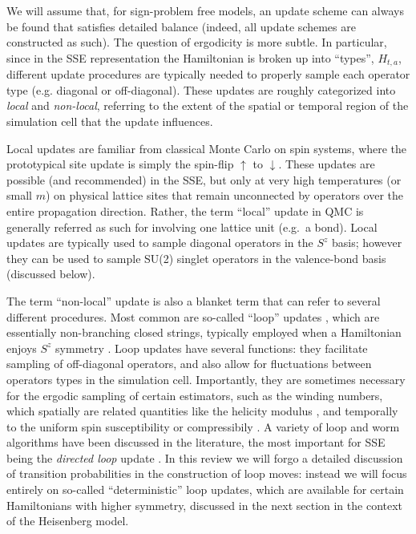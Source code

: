 \documentclass[vecphys]{svmult}
\begin{document}
We will assume that, for sign-problem free models, an update scheme can always be found that satisfies detailed balance (indeed, all update schemes are constructed as such).  The question of ergodicity is more subtle.  
In particular, since in the SSE representation the Hamiltonian is broken up into ``types'', $H_{t,a}$, different update procedures are typically needed to properly sample each operator type (e.g. diagonal or off-diagonal).  These updates are roughly categorized into {\em local} and {\em non-local}, referring to the extent of the spatial or temporal region of the simulation cell that the update influences.

Local updates are familiar from classical Monte Carlo on spin systems, where the prototypical site update is simply the spin-flip $\uparrow$ to $\downarrow$.  These updates are possible (and recommended) in the SSE, but only at very high temperatures (or small $m$) on physical lattice sites that remain unconnected by operators over the entire propagation direction.  Rather, the term ``local'' update in QMC is generally referred as such for involving one lattice unit (e.g.~a bond).  Local updates are typically used to sample diagonal operators in the $S^z$ basis; however they can be used to sample SU(2) singlet operators in the valence-bond basis (discussed below).

The term ``non-local'' update is also a blanket term that can refer to several different procedures.  Most common are so-called ``loop'' updates \cite{Melko:Evertz93},
which are essentially non-branching closed strings,
typically employed when a Hamiltonian enjoys $S^z$ symmetry \cite{Melko:Sandvik99}.  Loop updates have several functions: they facilitate sampling of off-diagonal operators, and also allow for fluctuations between operators types in the simulation cell.  Importantly, they are sometimes necessary for the ergodic sampling of certain estimators, such as the winding numbers, which spatially are related quantities like the helicity modulus \cite{Melko:PC}, and temporally to the uniform spin susceptibility or compressibily \cite{Melko:HGEloop}.  A variety of loop and worm algorithms have been discussed in the literature, the most important for SSE being the {\em directed loop} update \cite{Melko:Syljuasen02}.  In this review we will forgo a detailed discussion of transition probabilities in the construction of loop moves: instead we will focus entirely on so-called ``deterministic'' loop updates, which are available for certain Hamiltonians with higher symmetry, discussed in the next section in the context of the Heisenberg model.
\end{document}

